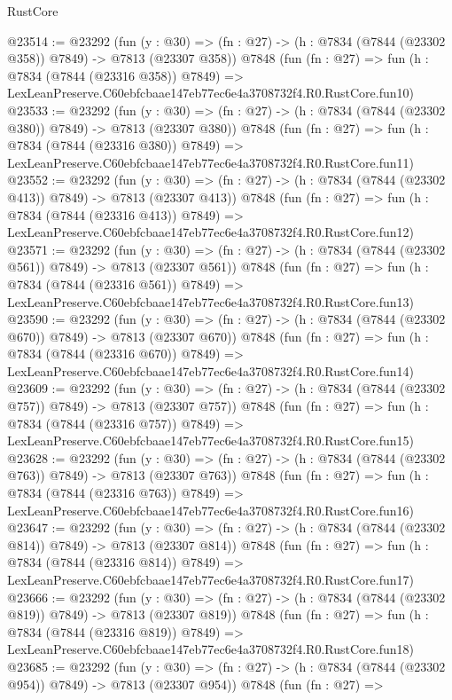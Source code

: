\begin{lexlean}{RustCore}
\begin{coremodule}
@23514 := @23292
    (fun (y : @30) => (fn : @27) -> (h : @7834 (@7844 (@23302 @358)) @7849) -> @7813 (@23307 @358))
    @7848
    (fun (fn : @27) =>
    fun (h : @7834 (@7844 (@23316 @358)) @7849) =>
    LexLeanPreserve.C60ebfcbaae147eb77ec6e4a3708732f4.R0.RustCore.fun10)
@23533 := @23292
    (fun (y : @30) => (fn : @27) -> (h : @7834 (@7844 (@23302 @380)) @7849) -> @7813 (@23307 @380))
    @7848
    (fun (fn : @27) =>
    fun (h : @7834 (@7844 (@23316 @380)) @7849) =>
    LexLeanPreserve.C60ebfcbaae147eb77ec6e4a3708732f4.R0.RustCore.fun11)
@23552 := @23292
    (fun (y : @30) => (fn : @27) -> (h : @7834 (@7844 (@23302 @413)) @7849) -> @7813 (@23307 @413))
    @7848
    (fun (fn : @27) =>
    fun (h : @7834 (@7844 (@23316 @413)) @7849) =>
    LexLeanPreserve.C60ebfcbaae147eb77ec6e4a3708732f4.R0.RustCore.fun12)
@23571 := @23292
    (fun (y : @30) => (fn : @27) -> (h : @7834 (@7844 (@23302 @561)) @7849) -> @7813 (@23307 @561))
    @7848
    (fun (fn : @27) =>
    fun (h : @7834 (@7844 (@23316 @561)) @7849) =>
    LexLeanPreserve.C60ebfcbaae147eb77ec6e4a3708732f4.R0.RustCore.fun13)
@23590 := @23292
    (fun (y : @30) => (fn : @27) -> (h : @7834 (@7844 (@23302 @670)) @7849) -> @7813 (@23307 @670))
    @7848
    (fun (fn : @27) =>
    fun (h : @7834 (@7844 (@23316 @670)) @7849) =>
    LexLeanPreserve.C60ebfcbaae147eb77ec6e4a3708732f4.R0.RustCore.fun14)
@23609 := @23292
    (fun (y : @30) => (fn : @27) -> (h : @7834 (@7844 (@23302 @757)) @7849) -> @7813 (@23307 @757))
    @7848
    (fun (fn : @27) =>
    fun (h : @7834 (@7844 (@23316 @757)) @7849) =>
    LexLeanPreserve.C60ebfcbaae147eb77ec6e4a3708732f4.R0.RustCore.fun15)
@23628 := @23292
    (fun (y : @30) => (fn : @27) -> (h : @7834 (@7844 (@23302 @763)) @7849) -> @7813 (@23307 @763))
    @7848
    (fun (fn : @27) =>
    fun (h : @7834 (@7844 (@23316 @763)) @7849) =>
    LexLeanPreserve.C60ebfcbaae147eb77ec6e4a3708732f4.R0.RustCore.fun16)
@23647 := @23292
    (fun (y : @30) => (fn : @27) -> (h : @7834 (@7844 (@23302 @814)) @7849) -> @7813 (@23307 @814))
    @7848
    (fun (fn : @27) =>
    fun (h : @7834 (@7844 (@23316 @814)) @7849) =>
    LexLeanPreserve.C60ebfcbaae147eb77ec6e4a3708732f4.R0.RustCore.fun17)
@23666 := @23292
    (fun (y : @30) => (fn : @27) -> (h : @7834 (@7844 (@23302 @819)) @7849) -> @7813 (@23307 @819))
    @7848
    (fun (fn : @27) =>
    fun (h : @7834 (@7844 (@23316 @819)) @7849) =>
    LexLeanPreserve.C60ebfcbaae147eb77ec6e4a3708732f4.R0.RustCore.fun18)
@23685 := @23292
    (fun (y : @30) => (fn : @27) -> (h : @7834 (@7844 (@23302 @954)) @7849) -> @7813 (@23307 @954))
    @7848
    (fun (fn : @27) =>

\end{coremodule}
\end{lexlean}
